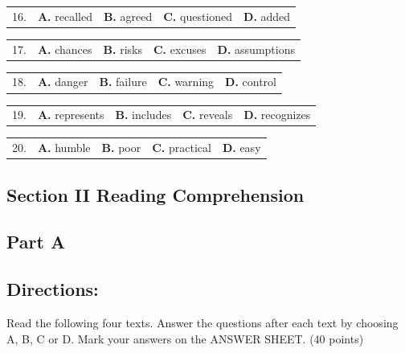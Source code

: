 \documentclass[UTF8,11pt]{ctexart}
\begin{document}
\noindent\begin{tabularx}{\linewidth}{@{}lXXXX@{}}16. & \textbf{A.} recalled & \textbf{B.} agreed & \textbf{C.} questioned & \textbf{D.} added\\\end{tabularx}\par

\noindent\begin{tabularx}{\linewidth}{@{}lXXXX@{}}17. & \textbf{A.} chances & \textbf{B.} risks & \textbf{C.} excuses & \textbf{D.} assumptions\\\end{tabularx}\par

\noindent\begin{tabularx}{\linewidth}{@{}lXXXX@{}}18. & \textbf{A.} danger & \textbf{B.} failure & \textbf{C.} warning & \textbf{D.} control\\\end{tabularx}\par

\noindent\begin{tabularx}{\linewidth}{@{}lXXXX@{}}19. & \textbf{A.} represents & \textbf{B.} includes & \textbf{C.} reveals & \textbf{D.} recognizes\\\end{tabularx}\par

\noindent\begin{tabularx}{\linewidth}{@{}lXXXX@{}}20. & \textbf{A.} humble & \textbf{B.} poor & \textbf{C.} practical & \textbf{D.} easy\\\end{tabularx}\par

\subsection*{\textbf{Section II Reading Comprehension}}


\subsection*{\textbf{Part A}}


\subsection*{\textbf{Directions:}}


Read the following four texts. Answer the questions after each text by choosing A, B, C or D. Mark your answers on the ANSWER SHEET. (40 points)
\end{document}
